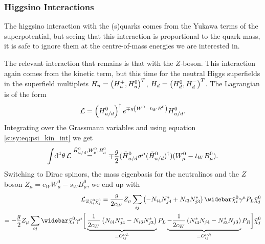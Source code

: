 \documentclass[../main.tex]{subfiles}
\begin{document}
\subsubsection*{Higgsino Interactions}
The higgsino interaction with the (s)quarks comes from the Yukawa terms of the
superpotential, but seeing that this interaction is proportional to the quark
mass, it is safe to ignore them at the centre-of-mass energies we are interested in.

The relevant interaction that remains is that with the \(Z\)-boson. This
interaction again comes from the kinetic term, but this time for the neutral
Higgs superfields in the superfield multiplets \(H_u = \left(H_u^+,
  H_u^0\right)^T\), \(H_d = \left(H_d^0, H_d^-\right)^T\). The Lagrangian is of the form
\begin{equation}
  \mathcal{L} = \left(H_{u/d}^0\right)^\dagger e^{\mp g\left(W^0 - t_W B^0\right)} H_{u/d}^0.
\end{equation}
Integrating over the Grassmann variables and using equation \cref{susy:eq:psi_kin_int} we get
\begin{equation}
  \integral{^4\theta} \L \stackrel{\tilde{H}_{u/d}^0, W^0_\mu, B^0_\mu}{=} \mp \frac{g}{2} (\tilde{H}_{u/d}^0 \sigma\^\mu (\tilde{H}_{u/d}^0)^\dagger) (W^0_\mu - t_W B_\mu^0).
\end{equation}
Switching to Dirac spinors, the mass eigenbasis for the neutralinos and the \(Z\) boson \(Z_\mu = c_W W^0_\mu - s_W B^0_\mu\), we end up with
\begin{align}
  \label{susy:eq:Zneuneu-interaction-L}
  \nonumber
  \L_{Z \tilde\chi^0_i \tilde\chi^0_j} = \frac{g}{2c_W} Z_\mu \sum_{ij}\pclosed{-N_{i4}N_{j4}^\ast + N_{i3}N_{j3}^\ast} \barnino[i] \gamma^\mu P_L \nino[j] \\
  = -\frac{g}{2} Z_\mu \sum_{ij}\barnino[i] \gamma^\mu \bigg[ \underbrace{\frac{1}{2c_W}\pclosed{N_{i4}N_{j4}^\ast - N_{i3}N_{j3}^\ast}}_{\equiv O^{\prime\prime L}_{ij}} P_L \underbrace{-\frac{1}{2c_W}\pclosed{N_{i4}^\ast N_{j4} - N_{i3}^\ast N_{j3}}}_{\equiv O^{\prime\prime R}_{ij}} P_R \bigg] \nino[j]
\end{align}
\end{document}
